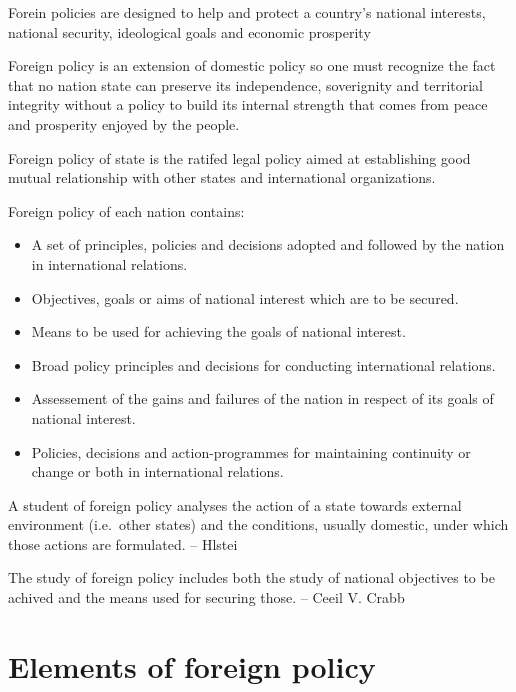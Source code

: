 \documentclass[
  openany]{book}
\providecommand{\tightlist}{%
  \setlength{\itemsep}{0pt}\setlength{\parskip}{0pt}}
\begin{document}
Forein policies are designed to help and protect a country's national interests, national security, ideological goals and economic prosperity

Foreign policy is an extension of domestic policy so one must recognize the fact that no nation state can preserve its independence, soverignity and territorial integrity without a policy to build its internal strength that comes from peace and prosperity enjoyed by the people.

Foreign policy of state is the ratifed legal policy aimed at establishing good mutual relationship with other states and international organizations.

Foreign policy of each nation contains:

\begin{itemize}
\tightlist
\item
  A set of principles, policies and decisions adopted and followed by the nation in international relations.
\item
  Objectives, goals or aims of national interest which are to be secured.
\item
  Means to be used for achieving the goals of national interest.
\item
  Broad policy principles and decisions for conducting international relations.
\item
  Assessement of the gains and failures of the nation in respect of its goals of national interest.
\item
  Policies, decisions and action-programmes for maintaining continuity or change or both in international relations.
\end{itemize}

A student of foreign policy analyses the action of a state towards external environment (i.e.~other states) and the conditions, usually domestic, under which those actions are formulated. -- Hlstei

The study of foreign policy includes both the study of national objectives to be achived and the means used for securing those. -- Ceeil V. Crabb

\hypertarget{elements-of-foreign-policy}{%
\section{Elements of foreign policy}\label{elements-of-foreign-policy}}
\end{document}

